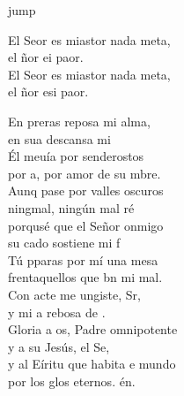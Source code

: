 \begin{cancion}jump\\
	\begin{chorus}%
		El Seor es miastor nada meta,\\
		el ñor ei paor.\\
		El Seor es miastor nada meta,\\
		el ñor esi paor.\jump\\
	\end{chorus}%
	En preras reposa mi alma,\\
	en sua descansa mi \\
	Él meuía por senderostos\\
	por a, por amor de su mbre.\\
	Aunq pase por valles oscuros\\
	ningmal, ningún mal ré\\
	porqusé que el Señor onmigo\\
	su cado sostiene mi f\\
	\jump
	Tú pparas por mí una mesa\\
	frentaquellos que bn mi mal.\\
	Con acte me ungiste, Sr,\\
	y mi a rebosa de .\\
	Gloria a os, Padre omnipotente\\
	y a su  Jesús, el Se,\\
	y al Eíritu que habita e mundo\\
	por los glos eternos. én.\\
\end{cancion}%
